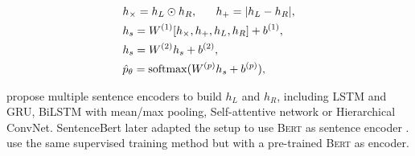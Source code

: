\begin{align}
\begin{split}
&h_{\times}=h_L\odot h_R, ~~~~~h_{+} = |h_L - h_R |, \labeq{similarity}\\
&h_s = W^{(1)}[h_{\times}, h_{+}, h_L, h_R] + b^{(1)}, \\
&h_s = W^{(2)}h_s + b^{(2)}, \\
&\hat{p}_{\theta} = \softmax(W^{(p)}h_s + b^{(p)}),\\
\end{split}
\end{align}

\textcite{conneau_17} propose multiple sentence encoders to build $h_{L} $ and $h_{R}$, including LSTM and GRU, BiLSTM with mean/max pooling, Self-attentive network or Hierarchical ConvNet. SentenceBert later adapted the setup to use \textsc{Bert} as sentence encoder \parencite{reimers_19}. \textcite{reimers_19} use the same supervised training method but with a pre-trained \textsc{Bert} as encoder.





